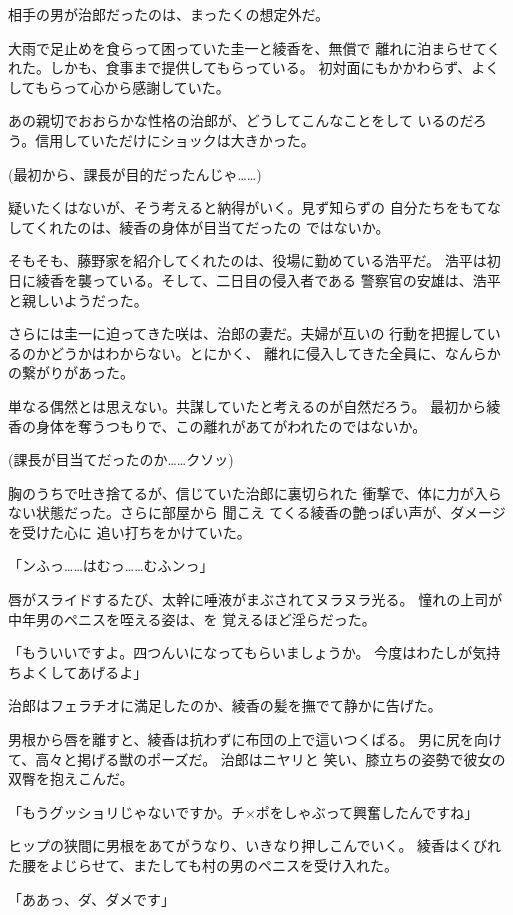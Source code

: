 ﻿\documentclass[
    book,tate,
    line_length=30zw,
    jafontsize=12pt,
    paper=b5j,
    landscape,
    ]{jlreq}
\begin{document}
相手の男が治郎だったのは、まったくの想定外だ。

大雨で足止めを食らって困っていた圭一と綾香を、無償で
離れに泊まらせてくれた。しかも、食事まで提供してもらっている。
初対面にもかかわらず、よくしてもらって心から感謝していた。

あの親切でおおらかな性格の治郎が、どうしてこんなことをして
いるのだろう。信用していただけにショックは大きかった。

(最初から、課長が目的だったんじゃ……)

疑いたくはないが、そう考えると納得がいく。見ず知らずの
自分たちをもてなしてくれたのは、綾香の身体が目当てだったの
ではないか。

そもそも、藤野家を紹介してくれたのは、役場に勤めている浩平だ。
浩平は初日に綾香を襲っている。そして、二日目の侵入者である
警察官の安雄は、浩平と親しいようだった。

さらには圭一に迫ってきた咲は、治郎の妻だ。夫婦が互いの
行動を把握しているのかどうかはわからない。とにかく、
離れに侵入してきた全員に、なんらかの繋がりがあった。

単なる偶然とは思えない。共謀していたと考えるのが自然だろう。
最初から綾香の身体を奪うつもりで、この離れがあてがわれたのではないか。

(課長が目当てだったのか……クソッ)

胸のうちで吐き捨てるが、信じていた治郎に裏切られた
衝撃で、体に力が入らない状態だった。さらに部屋から
聞こえ てくる綾香の艶っぽい声が、ダメージを受けた心に
追い打ちをかけていた。

「ンふっ……はむっ……むふンっ」

唇がスライドするたび、太幹に唾液がまぶされてヌラヌラ光る。
憧れの上司が中年男のペニスを咥える姿は、を
覚えるほど淫らだった。

「もういいですよ。四つんいになってもらいましょうか。
今度はわたしが気持ちよくしてあげるよ」

治郎はフェラチオに満足したのか、綾香の髪を撫でて静かに告げた。

男根から唇を離すと、綾香は抗わずに布団の上で這いつくばる。
男に尻を向けて、高々と掲げる獣のポーズだ。 治郎はニヤリと
笑い、膝立ちの姿勢で彼女の双臀を抱えこんだ。

「もうグッショリじゃないですか。チ×ポをしゃぶって興奮したんですね」

ヒップの狭間に男根をあてがうなり、いきなり押しこんでいく。
綾香はくびれた腰をよじらせて、またしても村の男のペニスを受け入れた。

「ああっ、ダ、ダメです」
\end{document}
